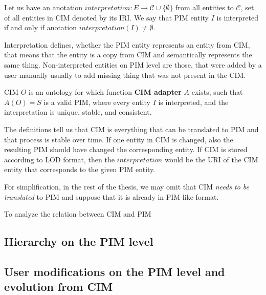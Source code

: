 
\smallskip

\begin{definition}[interpretation]
    Let us have an anotation $interpretation: E \rightarrow \mathcal{C} \cup \{\emptyset\}$ from all entities to $\mathcal{C}$, set of all entities in CIM denoted by its IRI. We say that PIM entity $I$ is interpreted if and only if anotation $interpretation(I) \neq \emptyset$.
\end{definition}

Interpretation defines, whether the PIM entity represents an entity from CIM, that means that the entity is a copy from CIM and semantically represents the same thing. Non-interpreted entities on PIM level are those, that were added by a user manually usually to add missing thing that was not present in the CIM.

\smallskip

\begin{definition}[CIM]
    CIM $O$ is an ontology for which function \textbf{CIM adapter} $A$ exists, such that $A(O) = S$ is a valid PIM, where every entity $I$ is interpreted, and the interpretation is unique, stable, and consistent.
\end{definition}

The definitions tell us that CIM is everything that can be translated to PIM and that process is stable over time. If one entity in CIM is changed, also the resulting PIM should have changed the corresponding entity. If CIM is stored according to LOD format, then the $interpretation$ would be the URI of the CIM entity that corresponds to the given PIM entity.

For simplification, in the rest of the thesis, we may omit that CIM \textit{needs to be translated} to PIM and suppose that it is already in PIM-like format.

\bigskip

To analyze the relation between CIM and PIM



\newpage\subsection{Hierarchy on the PIM level}




\newpage\subsection{User modifications on the PIM level and evolution from CIM}



